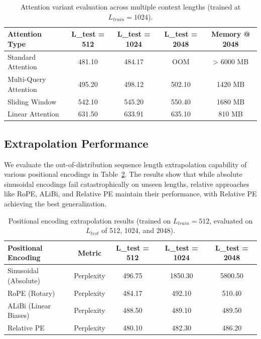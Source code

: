 \documentclass[11pt,a4paper]{article}
\begin{document}
\begin{table}[htbp]
    \centering
    \caption{Attention variant evaluation across multiple context lengths (trained at $L_{train}=1024$).}
    \label{tab:attention_extrap}
    \begin{tabular}{lcccc}
        \toprule
        \textbf{Attention Type} & \textbf{L\_test = 512} & \textbf{L\_test = 1024} & \textbf{L\_test = 2048} & \textbf{Memory @ 2048} \\
        \midrule
        Standard Attention & 481.10 & 484.17 & OOM & > 6000 MB \\
        Multi-Query Attention & 495.20 & 498.12 & 502.10 & 1420 MB \\
        Sliding Window & 542.10 & 545.20 & 550.40 & 1680 MB \\
        Linear Attention & 631.50 & 633.91 & 635.10 & 810 MB \\
        \bottomrule
    \end{tabular}
\end{table}

\subsection{Extrapolation Performance}
We evaluate the out-of-distribution sequence length extrapolation capability of various positional encodings in Table~\ref{tab:extrapolation}. The results show that while absolute sinusoidal encodings fail catastrophically on unseen lengths, relative approaches like RoPE, ALiBi, and Relative PE maintain their performance, with Relative PE achieving the best generalization.

\begin{table}[htbp]
    \centering
    \caption{Positional encoding extrapolation results (trained on $L_{train}=512$, evaluated on $L_{test}$ of 512, 1024, and 2048).}
    \label{tab:extrapolation}
    \begin{tabular}{lcccc}
        \toprule
        \textbf{Positional Encoding} & \textbf{Metric} & \textbf{L\_test = 512} & \textbf{L\_test = 1024} & \textbf{L\_test = 2048} \\
        \midrule
        Sinusoidal (Absolute) & Perplexity & 496.75 & 1850.30 & 5800.50 \\
        RoPE (Rotary) & Perplexity & 484.17 & 492.10 & 510.40 \\
        ALiBi (Linear Biases) & Perplexity & 488.50 & 489.10 & 489.50 \\
        Relative PE & Perplexity & 480.10 & 482.30 & 486.20 \\
        \bottomrule
    \end{tabular}
\end{table}
\end{document}
